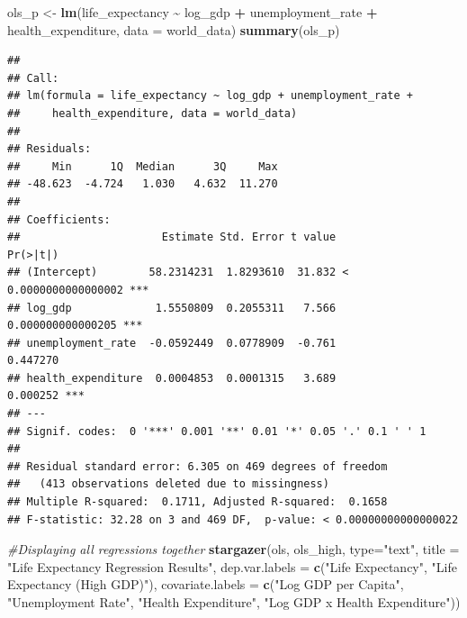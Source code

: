 \documentclass[
]{article}
\newenvironment{Shaded}{\begin{snugshade}}{\end{snugshade}}
\newcommand{\AttributeTok}[1]{\textcolor[rgb]{0.13,0.29,0.53}{#1}}
\newcommand{\CommentTok}[1]{\textcolor[rgb]{0.56,0.35,0.01}{\textit{#1}}}
\newcommand{\FunctionTok}[1]{\textcolor[rgb]{0.13,0.29,0.53}{\textbf{#1}}}
\newcommand{\NormalTok}[1]{#1}
\newcommand{\OtherTok}[1]{\textcolor[rgb]{0.56,0.35,0.01}{#1}}
\newcommand{\SpecialCharTok}[1]{\textcolor[rgb]{0.81,0.36,0.00}{\textbf{#1}}}
\newcommand{\StringTok}[1]{\textcolor[rgb]{0.31,0.60,0.02}{#1}}
\begin{document}
\begin{Shaded}
\begin{Highlighting}[]
\NormalTok{ols\_p }\OtherTok{\textless{}{-}} \FunctionTok{lm}\NormalTok{(life\_expectancy }\SpecialCharTok{\textasciitilde{}}\NormalTok{ log\_gdp }\SpecialCharTok{+}\NormalTok{ unemployment\_rate }\SpecialCharTok{+}\NormalTok{ health\_expenditure, }\AttributeTok{data =}\NormalTok{ world\_data)}
\FunctionTok{summary}\NormalTok{(ols\_p)}
\end{Highlighting}
\end{Shaded}

\begin{verbatim}
## 
## Call:
## lm(formula = life_expectancy ~ log_gdp + unemployment_rate + 
##     health_expenditure, data = world_data)
## 
## Residuals:
##     Min      1Q  Median      3Q     Max 
## -48.623  -4.724   1.030   4.632  11.270 
## 
## Coefficients:
##                      Estimate Std. Error t value             Pr(>|t|)    
## (Intercept)        58.2314231  1.8293610  31.832 < 0.0000000000000002 ***
## log_gdp             1.5550809  0.2055311   7.566    0.000000000000205 ***
## unemployment_rate  -0.0592449  0.0778909  -0.761             0.447270    
## health_expenditure  0.0004853  0.0001315   3.689             0.000252 ***
## ---
## Signif. codes:  0 '***' 0.001 '**' 0.01 '*' 0.05 '.' 0.1 ' ' 1
## 
## Residual standard error: 6.305 on 469 degrees of freedom
##   (413 observations deleted due to missingness)
## Multiple R-squared:  0.1711, Adjusted R-squared:  0.1658 
## F-statistic: 32.28 on 3 and 469 DF,  p-value: < 0.00000000000000022
\end{verbatim}

\begin{Shaded}
\begin{Highlighting}[]
\CommentTok{\#Displaying all regressions together}
\FunctionTok{stargazer}\NormalTok{(ols, ols\_high, }\AttributeTok{type=}\StringTok{"text"}\NormalTok{,}
          \AttributeTok{title =} \StringTok{"Life Expectancy Regression Results"}\NormalTok{,}
          \AttributeTok{dep.var.labels =} \FunctionTok{c}\NormalTok{(}\StringTok{"Life Expectancy"}\NormalTok{, }\StringTok{"Life Expectancy (High GDP)"}\NormalTok{),}
          \AttributeTok{covariate.labels =} \FunctionTok{c}\NormalTok{(}\StringTok{"Log GDP per Capita"}\NormalTok{, }\StringTok{"Unemployment Rate"}\NormalTok{, }\StringTok{"Health Expenditure"}\NormalTok{, }\StringTok{"Log GDP x Health Expenditure"}\NormalTok{))}
\end{Highlighting}
\end{Shaded}
\end{document}
